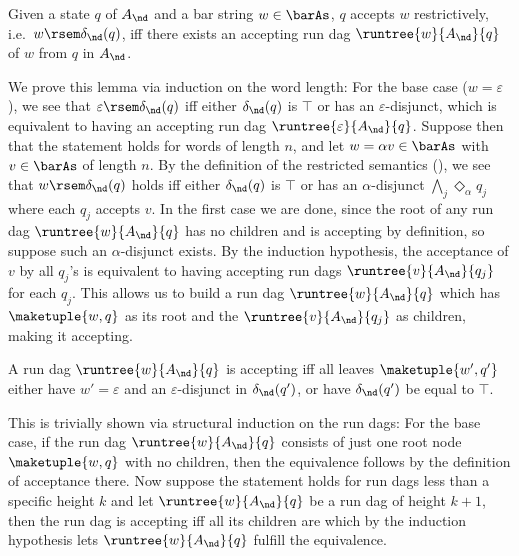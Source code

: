 \documentclass[10pt, final, conference, a4paper, twocolumn]{IEEEtran}
\begin{document}
\begin{lem}
  Given a state $q$ of $A_{\nd}$ and a bar string $w \in \barAs$, $q$ accepts $w$ restrictively, i.e.~$w \rsem \delta_{\nd}(q)$, iff there exists an accepting run dag  $\runtree{w}{A_{\nd}}{q}$ of $w$ from $q$ in $A_{\nd}$.
\end{lem}
\begin{IEEEproof}
  We prove this lemma via induction on the word length: For the base case ($w = \varepsilon$), we see
  that $\varepsilon \rsem \delta_{\nd}(q)$ iff either $\delta_{\nd}(q)$ is $\top$ or has an
  $\varepsilon$-disjunct, which is equivalent to having an accepting run dag $\runtree{\varepsilon}{A_{\nd}}{q}$.
  Suppose then that the statement holds for words of length $n$, and
  let $w = \alpha v \in \barAs$ with $v \in \barAs$ of length $n$. By the definition of the restricted
  semantics (), we see that $w \rsem \delta_{\nd}(q)$ holds iff either $\delta_{\nd}(q)$
  is $\top$ or has an $\alpha$-disjunct $\bigwedge_{j} \Diamond_\alpha q_j$ where each $q_j$ accepts $v$. In
  the first case we are done, since the root of any run dag $\runtree{w}{A_{\nd}}{q}$ has no children and
  is accepting by definition, so suppose such an $\alpha$-disjunct exists. By the induction hypothesis,
  the acceptance of $v$ by all $q_j$'s is equivalent to having accepting run dags $\runtree{v}{A_{\nd}}{q_j}$
  for each $q_j$. This allows us to build a run dag $\runtree{w}{A_{\nd}}{q}$ which has $\maketuple{w, q}$ as
  its root and the $\runtree{v}{A_{\nd}}{q_j}$ as children, making it accepting.
\end{IEEEproof}

\begin{lem}\label{lem:accruntree}%
  A run dag $\runtree{w}{A_{\nd}}{q}$ is accepting iff all leaves $\maketuple{w',q'}$
  either have $w' = \varepsilon$ and an $\varepsilon$-disjunct in $\delta_{\nd}(q')$,
  or have $\delta_{\nd}(q')$ be equal to $\top$.
\end{lem}
\begin{IEEEproof}
  This is trivially shown via structural induction on the run dags: For the base case,
  if the run dag $\runtree{w}{A_{\nd}}{q}$ consists of just one root node $\maketuple{w, q}$
  with no children, then the equivalence follows by the definition of acceptance there.
  Now suppose the statement holds for run dags less than a specific height $k$ and
  let $\runtree{w}{A_{\nd}}{q}$ be a run dag of height $k + 1$, then the run dag is
  accepting iff all its children are which by the induction hypothesis lets $\runtree{w}{A_{\nd}}{q}$
  fulfill the equivalence.
\end{IEEEproof}
\end{document}
